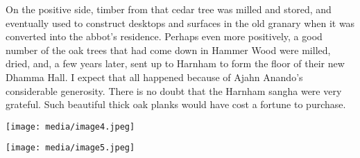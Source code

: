 On the positive side, timber from that cedar tree was milled and stored,
and eventually used to construct desktops and surfaces in the old
granary when it was converted into the abbot's residence. Perhaps even
more positively, a good number of the oak trees that had come down in
Hammer Wood were milled, dried, and, a few years later, sent up to
Harnham to form the floor of their new Dhamma Hall. I expect that all
happened because of Ajahn Anando's considerable generosity. There is no
doubt that the Harnham sangha were very grateful. Such beautiful thick
oak planks would have cost a fortune to purchase.

\texttt{[image: media/image4.jpeg]}

\texttt{[image: media/image5.jpeg]}

